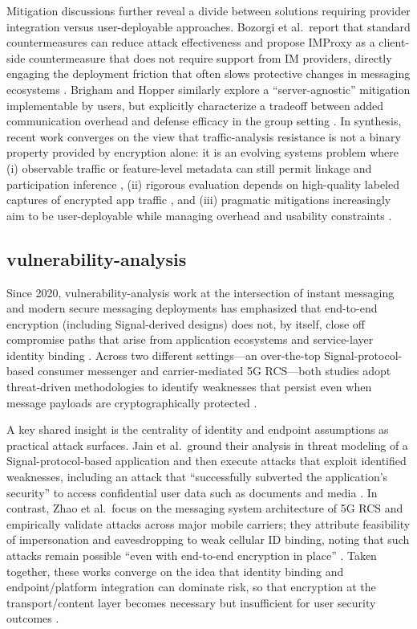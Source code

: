 Mitigation discussions further reveal a divide between solutions requiring provider integration versus user-deployable approaches. Bozorgi et al.\ report that standard countermeasures can reduce attack effectiveness and propose IMProxy as a client-side countermeasure that does not require support from IM providers, directly engaging the deployment friction that often slows protective changes in messaging ecosystems \cite{bozorgi2023}. Brigham and Hopper similarly explore a ``server-agnostic'' mitigation implementable by users, but explicitly characterize a tradeoff between added communication overhead and defense efficacy in the group setting \cite{brigham2025}. In synthesis, recent work converges on the view that traffic-analysis resistance is not a binary property provided by encryption alone: it is an evolving systems problem where (i) observable traffic or feature-level metadata can still permit linkage and participation inference \cite{bozorgi2023,brigham2025}, (ii) rigorous evaluation depends on high-quality labeled captures of encrypted app traffic \cite{erdenebaatar2023}, and (iii) pragmatic mitigations increasingly aim to be user-deployable while managing overhead and usability constraints \cite{bozorgi2023,brigham2025}.

\subsection{vulnerability-analysis}
Since 2020, vulnerability-analysis work at the intersection of instant messaging and modern secure messaging deployments has emphasized that end-to-end encryption (including Signal-derived designs) does not, by itself, close off compromise paths that arise from application ecosystems and service-layer identity binding \cite{jain2021,zhao2022}. Across two different settings—an over-the-top Signal-protocol-based consumer messenger and carrier-mediated 5G RCS—both studies adopt threat-driven methodologies to identify weaknesses that persist even when message payloads are cryptographically protected \cite{jain2021,zhao2022}.

A key shared insight is the centrality of identity and endpoint assumptions as practical attack surfaces. Jain et al.\ ground their analysis in threat modeling of a Signal-protocol-based application and then execute attacks that exploit identified weaknesses, including an attack that “successfully subverted the application’s security” to access confidential user data such as documents and media \cite{jain2021}. In contrast, Zhao et al.\ focus on the messaging system architecture of 5G RCS and empirically validate attacks across major mobile carriers; they attribute feasibility of impersonation and eavesdropping to weak cellular ID binding, noting that such attacks remain possible “even with end-to-end encryption in place” \cite{zhao2022}. Taken together, these works converge on the idea that identity binding and endpoint/platform integration can dominate risk, so that encryption at the transport/content layer becomes necessary but insufficient for user security outcomes \cite{jain2021,zhao2022}.

